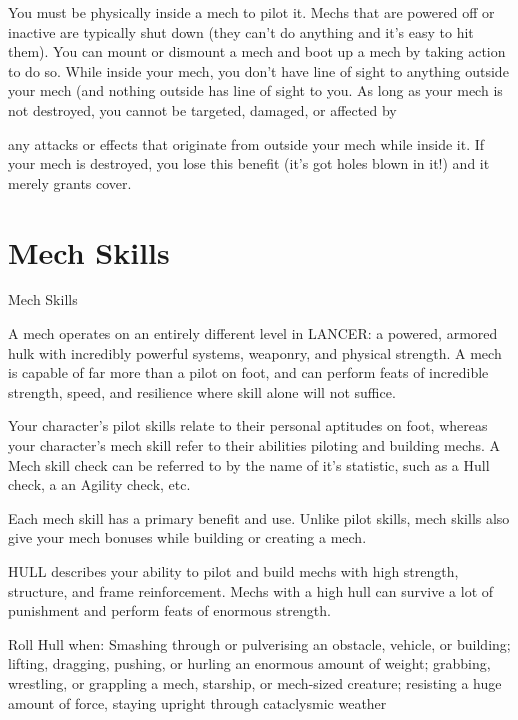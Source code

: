 You must be physically inside a mech to pilot it. Mechs that are powered off or inactive are  
typically shut down (they can’t do anything and it’s easy to hit them). You can mount or  
dismount a mech and boot up a mech by taking action to do so. While inside your mech, you  
don’t have line of sight to anything outside your mech (and nothing outside has line of sight to  
you. As long as your mech is not destroyed, you cannot be targeted, damaged, or affected by  

                                                                                                                


any attacks or effects that originate from outside your mech while inside it. If your mech is  
destroyed, you lose this benefit (it’s got holes blown in it!) and it merely grants cover.
 

\chapter{Mech Skills}
                                                  Mech Skills  

A mech operates on an entirely different level in LANCER: a powered, armored hulk with  
incredibly powerful systems, weaponry, and physical strength. A mech is capable of far more than  
a pilot on foot, and can perform feats of incredible strength, speed, and resilience where skill  
alone will not suffice.  

Your character’s pilot skills relate to their personal aptitudes on foot, whereas your character’s  
mech skill refer to their abilities piloting and building mechs. A Mech skill check can be referred to  
by the name of it’s statistic, such as a Hull check, a an Agility check, etc.  

Each mech skill has a primary benefit and use. Unlike pilot skills, mech skills also give your mech  
bonuses while building or creating a mech.  

HULL describes your ability to pilot and build mechs with high strength, structure, and frame  
reinforcement. Mechs with a high hull can survive a lot of punishment and perform feats of  
enormous strength.  

Roll Hull when: Smashing through or pulverising an obstacle, vehicle, or building; lifting, dragging,  
pushing, or hurling an enormous amount of weight; grabbing, wrestling, or grappling a mech,  
starship, or mech-sized creature; resisting a huge amount of force, staying upright through  
cataclysmic weather  

